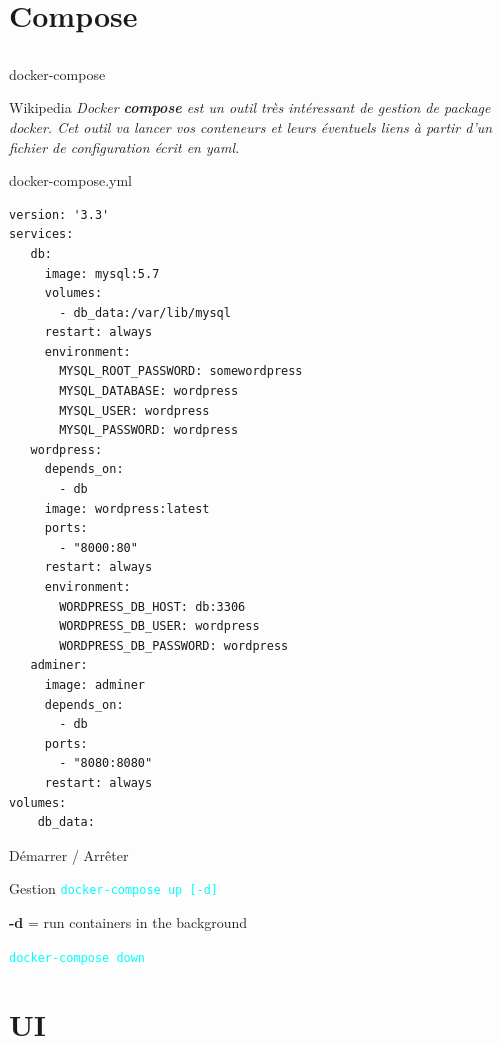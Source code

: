 \documentclass{beamer}
\begin{document}
\section{Compose}
\subsection{}

\begin{frame}{docker-compose}
\begin{block}{Wikipedia}
{\it 
Docker \textbf{compose} est un outil très intéressant de gestion de package docker. Cet outil va lancer vos conteneurs et leurs éventuels liens à partir d'un fichier de configuration écrit en yaml.}
\end{block}
\end{frame}

\begin{frame}[fragile]{}
\begin{block}{\tiny docker-compose.yml}
\tiny
\begin{verbatim}
version: '3.3'
services:
   db:
     image: mysql:5.7
     volumes:
       - db_data:/var/lib/mysql
     restart: always
     environment:
       MYSQL_ROOT_PASSWORD: somewordpress
       MYSQL_DATABASE: wordpress
       MYSQL_USER: wordpress
       MYSQL_PASSWORD: wordpress
   wordpress:
     depends_on:
       - db
     image: wordpress:latest
     ports:
       - "8000:80"
     restart: always
     environment:
       WORDPRESS_DB_HOST: db:3306
       WORDPRESS_DB_USER: wordpress
       WORDPRESS_DB_PASSWORD: wordpress
   adminer:
     image: adminer
     depends_on:
       - db
     ports:
       - "8080:8080"
     restart: always
volumes:
    db_data:
\end{verbatim}
\end{block}
\end{frame}

\begin{frame}[fragile]{Démarrer / Arrêter}
\begin{block}{Gestion}
\textcolor{cyan}{\verb?docker-compose up [-d]?}

\textbf{-d} = run containers in the background
\newline

\textcolor{cyan}{\verb?docker-compose down?}
\end{block}
\end{frame}


\section{UI}
\end{document}
